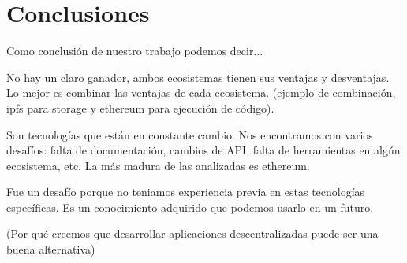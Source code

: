 \section{Conclusiones}

Como conclusión de nuestro trabajo podemos decir... 

No hay un claro ganador, ambos ecosistemas tienen sus ventajas y desventajas. Lo mejor es combinar las ventajas de cada ecosistema.
(ejemplo de combinación, ipfs para storage y ethereum para ejecución de código).

Son tecnologías que están en constante cambio. Nos encontramos con varios desafíos: falta de documentación, cambios de API, falta de herramientas en algún ecosistema, etc. La más madura de las analizadas es ethereum.

Fue un desafío porque no teniamos experiencia previa en estas tecnologías específicas. Es un conocimiento adquirido que podemos usarlo en un futuro. 

(Por qué creemos que desarrollar aplicaciones descentralizadas puede ser una buena alternativa)